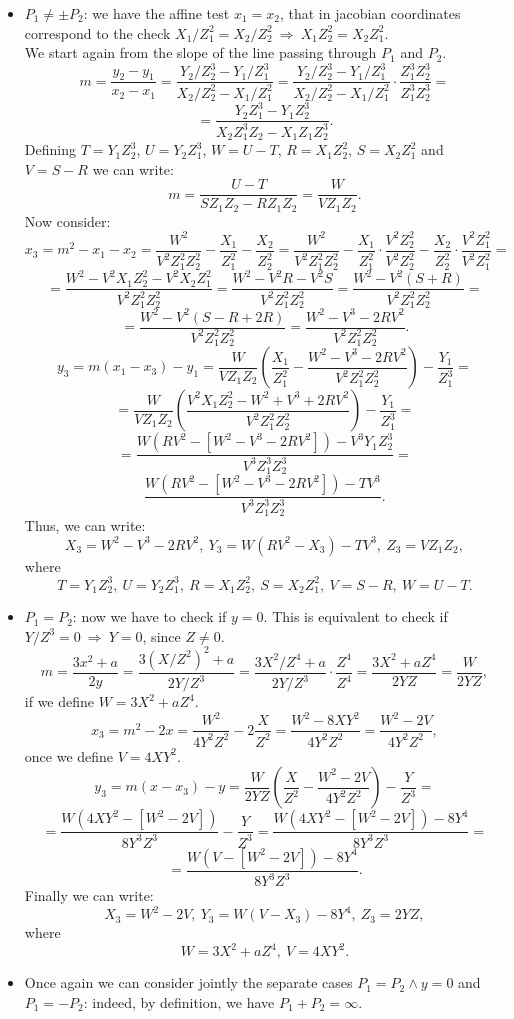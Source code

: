 \begin{itemize}
	\item $P_1 \neq \pm P_2$: we have the affine test $x_1 = x_2$, that in jacobian coordinates correspond to the check $X_1/Z_1^2 = X_2/Z_2^2 \ \Longrightarrow \ X_1Z_2^2 = X_2Z_1^2$. 
	\\
	We start again from the slope of the line passing through $P_1$ and $P_2$.
	$$m = \frac{y_2 - y_1}{x_2 - x_1} = \frac{Y_2/Z_2^3 - Y_1/Z_1^3}{X_2/Z_2^2 - X_1/Z_1^2} = \frac{Y_2/Z_2^3 - Y_1/Z_1^3}{X_2/Z_2^2 - X_1/Z_1^2} \cdot \frac{Z_1^3Z_2^3}{Z_1^3Z_2^3} =$$ $$= \frac{Y_2Z_1^3 - Y_1Z_2^3}{X_2Z_1^3Z_2 - X_1Z_1Z_2^3}.$$
	Defining $T = Y_1Z_2^3$, $U = Y_2Z_1^3$, $W = U - T$, $R = X_1Z_2^2$, $S = X_2Z_1^2$ and $V = S - R$ we can write:
	$$m = \frac{U - T}{SZ_1Z_2 - RZ_1Z_2} = \frac{W}{VZ_1Z_2}.$$
	Now consider:
	$$x_3 = m^2 - x_1 - x_2 = \frac{W^2}{V^2Z_1^2Z_2^2} - \frac{X_1}{Z_1^2} - \frac{X_2}{Z_2^2} = \frac{W^2}{V^2Z_1^2Z_2^2} - \frac{X_1}{Z_1^2}\cdot\frac{V^2Z_2^2}{V^2Z_2^2} - \frac{X_2}{Z_2^2}\cdot\frac{V^2Z_1^2}{V^2Z_1^2} = $$ $$= \frac{W^2 - V^2X_1Z_2^2 - V^2X_2Z_1^2}{V^2Z_1^2Z_2^2} = \frac{W^2 - V^2R - V^2S}{V^2Z_1^2Z_2^2} = \frac{W^2 - V^2(S + R)}{V^2Z_1^2Z_2^2} = $$ $$= \frac{W^2 - V^2(S - R + 2R)}{V^2Z_1^2Z_2^2} = \frac{W^2 - V^3 - 2RV^2}{V^2Z_1^2Z_2^2}.$$
	$$y_3 = m(x_1 - x_3) - y_1 = \frac{W}{VZ_1Z_2}\left(\frac{X_1}{Z_1^2} - \frac{W^2 - V^3 - 2RV^2}{V^2Z_1^2Z_2^2}\right) - \frac{Y_1}{Z_1^3} = $$ $$= \frac{W}{VZ_1Z_2}\left(\frac{V^2X_1Z_2^2 - W^2 + V^3 + 2RV^2}{V^2Z_1^2Z_2^2}\right) - \frac{Y_1}{Z_1^3} = $$ $$= \frac{W(RV^2 - [W^2 - V^3 - 2RV^2]) - V^3Y_1Z_2^3}{V^3Z_1^3Z_2^3} = $$ $$\frac{W(RV^2 - [W^2 - V^3 - 2RV^2]) - TV^3}{V^3Z_1^3Z_2^3}.$$
	Thus, we can write:
	$$X_3 = W^2 - V^3 - 2RV^2, \ Y_3 = W(RV^2 - X_3) - TV^3, \ Z_3 = VZ_1Z_2,$$
	where
	$$T = Y_1Z_2^3, \ U = Y_2Z_1^3, \ R = X_1Z_2^2, \ S = X_2Z_1^2, \ V = S - R, \ W = U - T.$$
	\item $P_1 = P_2$:  now we have to check if $y = 0$. This is equivalent to check if  $Y / Z^3 = 0 \ \Longrightarrow \ Y = 0$, since $Z \neq 0$.
	$$m = \frac{3x^2 + a}{2y} = \frac{3(X/Z^2)^2 + a}{2Y/Z^3} = \frac{3X^2/Z^4 + a}{2Y/Z^3} \cdot \frac{Z^4}{Z^4} = \frac{3X^2 + aZ^4}{2YZ} = \frac{W}{2YZ},$$
	if we define $W = 3X^2 + aZ^4$.
	$$x_3 = m^2 - 2x = \frac{W^2}{4Y^2Z^2} - 2\frac{X}{Z^2} = \frac{W^2 - 8XY^2}{4Y^2Z^2} = \frac{W^2 - 2V}{4Y^2Z^2},$$ once we define $V = 4XY^2$.
	$$y_3 = m(x - x_3) - y = \frac{W}{2YZ}\left(\frac{X}{Z^2} - \frac{W^2 - 2V}{4Y^2Z^2}\right) - \frac{Y}{Z^3} = $$ $$= \frac{W(4XY^2 - [W^2 - 2V])}{8Y^3Z^3} - \frac{Y}{Z^3} = \frac{W(4XY^2 - [W^2 - 2V]) - 8Y^4}{8Y^3Z^3} =$$ $$= \frac{W(V - [W^2 - 2V]) - 8Y^4}{8Y^3Z^3}.$$
	Finally we can write:
	$$X_3 = W^2 - 2V, \ Y_3 = W(V - X_3) - 8Y^4, \ Z_3 = 2YZ,$$
	where
	$$W = 3X^2 + aZ^4, \ V = 4XY^2.$$
	\item Once again we can consider jointly the separate cases $P_1 = P_2 \wedge y = 0$ and $P_1 = -P_2$: indeed, by definition, we have $P_1 + P_2 = \infty$.
\end{itemize}
